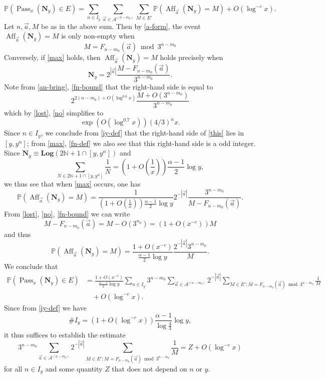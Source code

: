 \documentclass[12pt,a4paper,reqno]{amsart}
\numberwithin{equation}{section}
\theoremstyle{plain}
\theoremstyle{definition}
\renewcommand\P{\mathbb{P}}
\newcommand\N{\mathbb{N}}
\newcommand\Log{\mathbf{Log}}
\newcommand\Aff{{\operatorname{Aff}}}
\newcommand\Pass{{\operatorname{Pass}}}
\renewcommand{\mod}{\bmod}
\begin{document}
$$  \P( \Pass_x( \mathbf{N}_y ) \in E )  =  \sum_{n \in I_y} \sum_{\vec a \in {\mathcal A}^{(n-m_0)}} \sum_{M \in E'} \P( \Aff_{\vec a}(\mathbf{N}_y) = M ) + O( \log^{-c} x  ).$$
Let $n,\vec a, M$ be as in the above sum.  Then by \eqref{a-form}, the event $\Aff_{\vec a}(\mathbf{N}_y) = M$ is only non-empty when 
\begin{equation}\label{max}
M = F_{n-m_0}(\vec a) \mod 3^{n-m_0}
\end{equation}
Conversely, if \eqref{max} holds, then $\Aff_{\vec a}(\mathbf{N}_y) = M$ holds precisely when
\begin{equation}\label{this}
 \mathbf{N}_y = 2^{|\vec a|} \frac{M - F_{n-m_0}(\vec a)}{3^{n-m_0}}.
\end{equation}
Note from \eqref{an-bring}, \eqref{fn-bound} that the right-hand side is equal to
$$ 2^{2(n-m_0)+O(\log^{0.6} x)} \frac{M + O( 3^{n-m_0} )}{3^{n-m_0}} $$
which by \eqref{lost}, \eqref{no} simplifies to
$$ \exp( O(\log^{0.7} x)) (4/3)^{n} x.$$
Since $n \in I_y$, we conclude from \eqref{iy-def} that the right-hand side of \eqref{this} lies in $[y, y^\alpha]$; from \eqref{max}, \eqref{fn-def} we also see that this right-hand side is a odd integer.  Since $\mathbf{N}_y \equiv \Log( 2\N+1 \cap [y,y^\alpha] )$ and
$$ \sum_{N \in 2\N+1 \cap [y,y^\alpha]} \frac{1}{N} = \left(1 + O\left( \frac{1}{x}\right)\right) \frac{\alpha-1}{2} \log y,$$
we thus see that when \eqref{max} occurs, one has
$$ \P( \Aff_{\vec a}(\mathbf{N}_y) = M ) = \frac{1}{\left(1 + O( \frac{1}{x})\right)\frac{\alpha-1}{2} \log y} 2^{-|\vec a|} \frac{3^{n-m_0}}{M - F_{n-m_0}(\vec a)}.$$
From \eqref{lost}, \eqref{no}, \eqref{fn-bound} we can write
$$ M - F_{n-m_0}(\vec a) = M - O(3^{n_0}) = (1 + O(x^{-c})) M$$
and thus
$$ \P( \Aff_{\vec a}(\mathbf{N}_y) = M ) = \frac{1 + O(x^{-c})}{\frac{\alpha-1}{2} \log y} \frac{2^{-|\vec a|} 3^{n-m_0}}{M}.$$
We conclude that
\begin{align*}
  \P( \Pass_x( \mathbf{N}_y ) \in E )  &= \frac{1 + O(x^{-c})}{\frac{\alpha-1}{2} \log y} \sum_{n \in I_y} 3^{n-m_0} \sum_{\vec a \in {\mathcal A}^{(n-m_0)}} 2^{-|\vec a|} \sum_{M \in E': M = F_{n-m_0}(\vec a) \mod 3^{n-m_0}} \frac{1}{M} \\
	&\quad +   O( \log^{-c} x  ).
	\end{align*}
Since  from \eqref{iy-def} we have
$$ \# I_y = (1 + O( \log^{-c} x  )) \frac{\alpha-1}{\log \frac{4}{3}} \log y,$$
it thus suffices to establish the estimate
\begin{equation}\label{zeno}
 3^{n-m_0} \sum_{\vec a \in {\mathcal A}^{(n-m_0)}} 2^{-|\vec a|} \sum_{M \in E': M = F_{n-m_0}(\vec a) \mod 3^{n-m_0}} \frac{1}{M} = Z + O( \log^{-c} x  )
\end{equation}
for all $n \in I_y$ and some quantity $Z$ that does not depend on $n$ or $y$.
\end{document}
